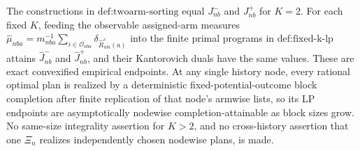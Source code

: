 The constructions in \(\text{def:twoarm-sorting}\) equal \(J_{nb}^{-}\) and \(J_{nb}^{+}\) for \(K=2\). For each fixed \(K\), feeding the observable assigned-arm measures \(\widehat\mu_{nba}=m_{nba}^{-1}\sum_{i\in\mathcal O_{nba}}\delta_{\widehat R_{nbi}^{c}(a)}\) into the finite primal programs in \(\text{def:fixed-k-lp}\) attains \(\widehat J_{nb}^{-}\) and \(\widehat J_{nb}^{+}\), and their Kantorovich duals have the same values. These are exact convexified empirical endpoints. At any single history node, every rational optimal plan is realized by a deterministic fixed-potential-outcome block completion after finite replication of that node's armwise lists, so its LP endpoints are asymptotically nodewise completion-attainable as block sizes grow. No same-size integrality assertion for \(K>2\), and no cross-history assertion that one \(\Xi_n\) realizes independently chosen nodewise plans, is made.